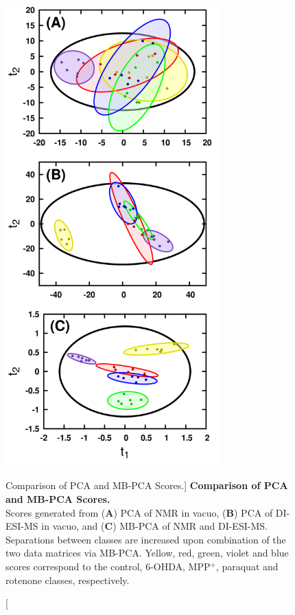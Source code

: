 \begin{figure}
\includegraphics[width=3.25in]{figs/apps/07-mbpca-t.png}
\caption
      [Comparison of PCA and MB-PCA Scores.]{
  {\bf Comparison of PCA and MB-PCA Scores.}
  \\
  Scores generated from ({\bf A}) PCA of \hnmr{} NMR in vacuo, ({\bf B}) PCA
  of DI-ESI-MS in vacuo, and ({\bf C}) MB-PCA of \hnmr{} NMR and DI-ESI-MS.
  Separations between classes are increased upon combination of the two
  data matrices via MB-PCA. Yellow, red, green, violet and blue scores
  correspond to the control, 6-OHDA, MPP$^+$, paraquat and rotenone classes,
  respectively.
}
\label{figure.4.7}
\end{figure}

